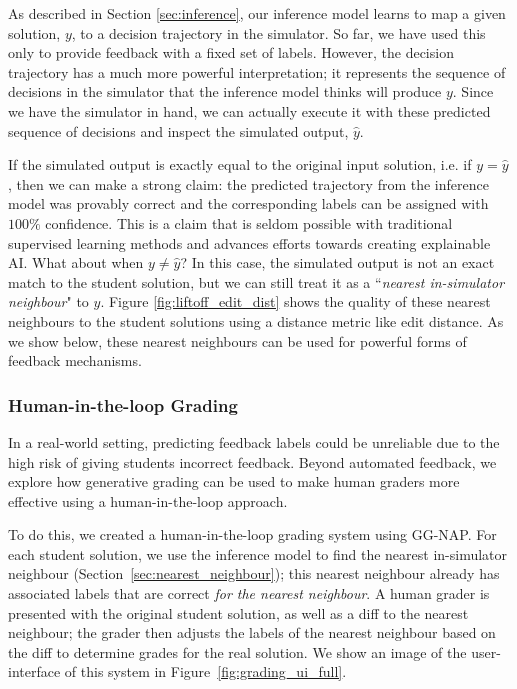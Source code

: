 As described in Section \ref{sec:inference}, our inference model learns to map a given solution, $y$, to a decision trajectory in the simulator. So far, we have used this only to provide feedback with a fixed set of labels. However, the decision trajectory has a much more powerful interpretation; it represents the sequence of decisions in the simulator that the inference model thinks will produce $y$. Since we have the simulator in hand, we can actually execute it with these predicted sequence of decisions and inspect the simulated output, $\widehat{y}$. 

If the simulated output is exactly equal to the original input solution, i.e. if $y = \widehat{y}$, then we can make a strong claim: the predicted trajectory from the inference model was provably correct and the corresponding labels can be assigned with $100\%$ confidence. This is a claim that is seldom possible with traditional supervised learning methods and advances efforts towards creating explainable AI.
What about when $y \neq \widehat{y}$? In this case, the simulated output is not an exact match to the student solution, but we can still treat it as a ``\textit{nearest in-simulator neighbour}" to $y$. Figure \ref{fig:liftoff_edit_dist} shows the quality of these nearest neighbours to the student solutions using a distance metric like edit distance.
As we show below, these nearest neighbours can be used for powerful forms of feedback mechanisms.

\subsubsection{Human-in-the-loop Grading}

In a real-world setting, predicting feedback labels could be unreliable due to the high risk of giving students incorrect feedback. Beyond automated feedback, we explore how generative grading can be used to make human graders more effective using a human-in-the-loop approach.

To do this, we created a human-in-the-loop grading system using GG-NAP. For each student solution, we use the inference model to find the nearest in-simulator neighbour (Section~\ref{sec:nearest_neighbour}); this nearest neighbour already has associated labels that are correct \textit{for the nearest neighbour}. A human grader is presented with the original student solution, as well as a diff to the nearest neighbour; the grader then adjusts the labels of the nearest neighbour based on the diff to determine grades for the real solution. We show an image of the user-interface of this system in Figure~\ref{fig:grading_ui_full}.

